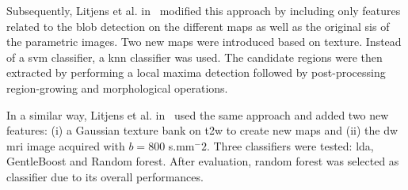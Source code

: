 Subsequently, Litjens et al. in~\cite{Litjens2012} modified this approach by including only features related to the blob detection on the different maps as well as the original \acp{si} of the parametric images. Two new maps were introduced based on texture. Instead of a \ac{svm} classifier, a \ac{knn} classifier was used. The candidate regions were then extracted by performing a local maxima detection followed by post-processing region-growing and morphological operations. 

In a similar way, Litjens et al. in~\cite{Litjens2014} used the same approach and added two new features: (i) a Gaussian texture bank on \ac{t2w} to create new maps and (ii) the \ac{dw} \ac{mri} image acquired with $b=800$ s.mm$^-2$. Three classifiers were tested: \ac{lda}, GentleBoost and Random forest. After evaluation, random forest was selected as classifier due to its overall performances.

